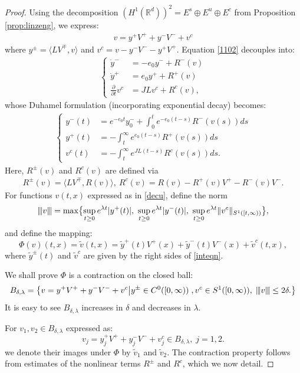 \documentclass[10pt,a4paper]{amsart}
\newcommand{\R}{\mathbb R}
\newcommand{\vertiii}[1]{{\left\vert\kern-0.25ex\left\vert\kern-0.25ex\left\vert #1 
    \right\vert\kern-0.25ex\right\vert\kern-0.25ex\right\vert}}
\begin{document}
\begin{proof} 
Using the decomposition $(H^1(\R^d))^2=E^s\oplus E^u\oplus E^c$ from Proposition \ref{prop:linzeng}, we express: 
\begin{align}\label{decu}
v=y^+V^++y^-V^-+v^c
\end{align}
where $y^{\pm}=\langle LV^{\mp}, v\rangle$ and $v^c=v-y^-V^--y^+V^+$. Equation \eqref{1102}  decouples into:
\begin{align*}
\begin{cases}
\dot y^-&=-e_0 y^-+R^-(v)\\
\dot y^+&=e_0 y^++R^+(v)\\
\frac{\partial}{\partial t}v^c&=JL v^c+R^c(v), 
\end{cases}
\end{align*}
whose Duhamel formulation (incorporating exponential decay) becomes:
\begin{align}\label{inteqn}
\begin{cases}
y^-(t)&=e^{-e_0 t} y_0^-+\int_0^t e^{-e_0(t-s) }R^-(v(s))ds\\
y^+(t)&=-\int_t^\infty e^{e_0(t-s)}R^+(v(s))ds\\
v^c(t)&=-\int_t^\infty e^{JL(t-s)}R^c(v(s))ds. 
\end{cases}
\end{align}
Here, $R^{\pm}(v)$ and $R^c(v)$ are defined via
\begin{align*}
R^{\pm}(v)=\langle LV^{\mp}, R(v)\rangle, \ R^c(v)=R(v)-R^+(v)V^+-R^-(v)V^-. 
\end{align*}
For functions $v(t, x)$ expressed as in \eqref{decu}, define the norm 
\[
\vertiii{ v}=\max\bigl\{\sup_{t\ge 0} e^{\lambda t}|y^+(t)|, \ \sup_{t\ge 0} e^{\lambda t}|y^-(t)|,\ \sup_{t\ge 0} e^{\lambda t}\|v^c\|_{S^1([t,\infty))}\bigr\},
\]
and define the mapping: 
\[
\Phi (v) (t,x) = \tilde v (t, x)  = \tilde y^+  (t) V^+(x) + \tilde y^-(t) V^-(x) + \tilde v^c(t, x),
\]
where $\tilde y^\pm (t)$ and $\tilde v^c$ are given by the right sides of \eqref{inteqn}. 

We shall prove $\Phi$ is a contraction on the closed ball:
\begin{align*}
B_{\delta,\lambda}=\bigl \{v = y^+ V^+ + y^- V^-+ v^c \bigl | y^{\pm} \in C^0([0, \infty))\;, v^c\in  S^1 ([0, \infty)),\; \vertiii{v}\le 2\delta.\bigr\}
\end{align*}
It is easy to see $B_{\delta, \lambda}$ increases in $\delta$ and decreases in $\lambda$. 

For $v_1, v_2 \in B_{\delta, \lambda}$ expressed as:  
\[v_j=y_j^+V^++y_j^-V^-+v_j^c\in B_{\delta, \lambda}, \; j=1,2. \]
we denote their images under $\Phi$ by $\tilde v_1$ and $\tilde v_2$. The contraction property follows from estimates of the nonlinear terms $R^{\pm}$ and $R^c$, which we now detail. 


\end{proof}
\end{document}
